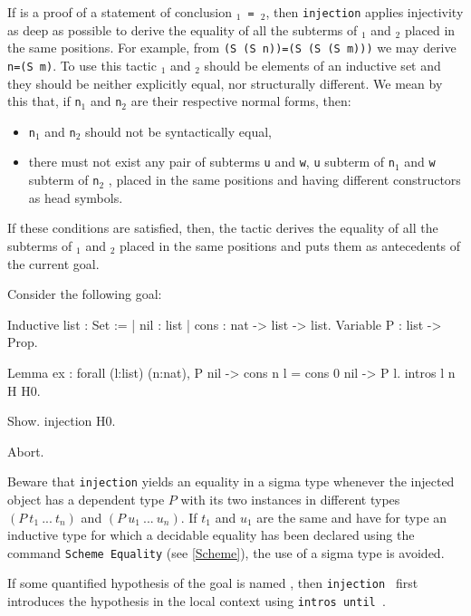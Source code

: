 \begin{coq_example*}
If {\term} is a proof of a statement of conclusion
 {\tt {\term$_1$} = {\term$_2$}},
then {\tt injection} applies injectivity as deep as possible to
derive the equality of all the subterms of {\term$_1$} and {\term$_2$}
placed in the same positions. For example, from {\tt (S
  (S n))=(S (S (S m)))} we may derive {\tt n=(S m)}.  To use this
tactic {\term$_1$} and {\term$_2$} should be elements of an inductive
set and they should be neither explicitly equal, nor structurally
different. We mean by this that, if {\tt n$_1$} and {\tt n$_2$} are
their respective normal forms, then:
\begin{itemize}
\item {\tt n$_1$} and {\tt n$_2$} should not be syntactically equal,
\item there must not exist any pair of subterms {\tt u} and {\tt w},
  {\tt u} subterm of {\tt n$_1$} and {\tt w} subterm of {\tt n$_2$} ,
  placed in the same positions and having different constructors as
  head symbols.
\end{itemize}
If these conditions are satisfied, then, the tactic derives the
equality of all the subterms of {\term$_1$} and {\term$_2$} placed in
the same positions and puts them as antecedents of the current goal.

\Example Consider the following goal:

\begin{coq_example*}
Inductive list : Set :=
  | nil : list
  | cons : nat -> list -> list.
Variable P : list -> Prop.
\end{coq_example*}
\begin{coq_eval}
Lemma ex :
 forall (l:list) (n:nat), P nil -> cons n l = cons 0 nil -> P l.
intros l n H H0.
\end{coq_eval}
\begin{coq_example}
Show.
injection H0.
\end{coq_example}
\begin{coq_eval}
Abort.
\end{coq_eval}

Beware that \texttt{injection} yields an equality in a sigma type
whenever the injected object has a dependent type $P$ with its two
instances in different types $(P~t_1~...~t_n)$ and
$(P~u_1~...~u_n)$. If $t_1$ and $u_1$ are the same and have for type
an inductive type for which a decidable equality has been declared
using the command {\tt Scheme Equality} (see \ref{Scheme}), the use of
a sigma type is avoided.

\Rem If some quantified hypothesis of the goal is named {\ident}, then
{\tt injection {\ident}} first introduces the hypothesis in the local
context using \texttt{intros until \ident}.


\end{coq_example*}
